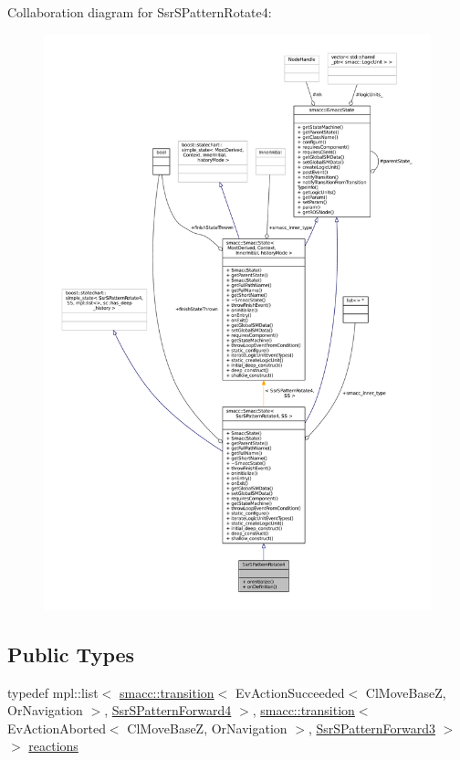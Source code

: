 Collaboration diagram for Ssr\+S\+Pattern\+Rotate4\+:
\nopagebreak
\begin{figure}[H]
\begin{center}
\leavevmode
\includegraphics[width=350pt]{structSsrSPatternRotate4__coll__graph}
\end{center}
\end{figure}
\subsection*{Public Types}
\begin{DoxyCompactItemize}
\item 
typedef mpl\+::list$<$ \hyperlink{classsmacc_1_1transition}{smacc\+::transition}$<$ Ev\+Action\+Succeeded$<$ Cl\+Move\+BaseZ, Or\+Navigation $>$, \hyperlink{structSsrSPatternForward4}{Ssr\+S\+Pattern\+Forward4} $>$, \hyperlink{classsmacc_1_1transition}{smacc\+::transition}$<$ Ev\+Action\+Aborted$<$ Cl\+Move\+BaseZ, Or\+Navigation $>$, \hyperlink{structSsrSPatternForward3}{Ssr\+S\+Pattern\+Forward3} $>$ $>$ \hyperlink{structSsrSPatternRotate4_a5fc19348bc1542dd740c3ffac81a75c0}{reactions}
\end{DoxyCompactItemize}
